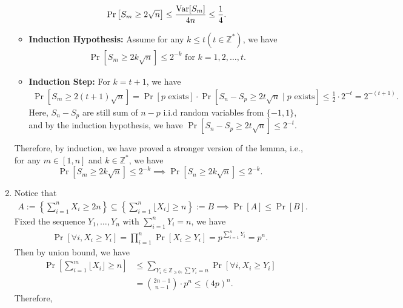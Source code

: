 \begin{answer}
\begin{enumerate}[label=\alph*).]
\begin{itemize}
\begin{align*}
                \Pr\left[S_m \ge 2\sqrt{n}\right] \le \frac{\mathrm{Var}[S_m]}{4n} \le \frac{1}{4}. 
            \end{align*}
            \item \textbf{Induction Hypothesis:} Assume for any $k \le t (t\in \mathbb{Z}^*)$, we have
            \begin{align*}
                \Pr\left[S_m \ge 2k\sqrt{n}\right] \le 2^{-k} \text{ for } k = 1,2,\dots,t.
            \end{align*}
            \item \textbf{Induction Step:} For $k = t+1$, we have
            \begin{align*}
                \Pr\left[S_m \ge 2(t+1)\sqrt{n}\right] = \Pr\left[p \text{ exists}\right] \cdot \Pr\left[S_n - S_p \ge 2t\sqrt{n} \mid p \text{ exists}\right] \le \frac{1}{2} \cdot 2^{-t} = 2^{-(t+1)}.
            \end{align*}
            Here, $S_n - S_p$ are still sum of $n-p$ i.i.d random variables from $\{-1, 1\}$, and by the induction hypothesis, we have $\Pr\left[S_n - S_p \ge 2t\sqrt{n}\right] \le 2^{-t}$.
        \end{itemize}
        Therefore, by induction, we have proved a stronger version of the lemma, i.e.,  for any $m \in [1,n]$ and $k \in \mathbb{Z}^*$, we have
        \[
            \Pr\left[S_m \ge 2k\sqrt{n}\right] \le 2^{-k} \implies \Pr\left[S_n \ge 2k\sqrt{n}\right] \le 2^{-k}.
        \]
        \item Notice that
        \begin{align*}
            A := \left\{\sum_{i=1}^{n}X_i \ge 2n\right\} \subseteq \left\{\sum_{i=1}^{n} \lfloor X_i \rfloor \ge n\right\} := B \implies \Pr[A] \le \Pr[B].
        \end{align*}
        Fixed the sequence $Y_1, \dots, Y_n$ with $\sum_{i=1}^{n} Y_i = n$, we have
        \begin{align*}
            \Pr\left[\forall i, X_i \ge Y_i\right] = \prod_{i=1}^{n} \Pr\left[X_i \ge Y_i\right] = p^{\sum_{i=1}^{n} Y_i} = p^n.
        \end{align*}
        Then by union bound, we have
        \begin{align*}
            \Pr\left[\sum_{i=1}^{m}\lfloor X_i \rfloor \ge n\right] &\le \sum_{Y_i \in \mathbb{Z}_{\ge 0}, \sum Y_i =n} \Pr\left[\forall i, X_i \ge Y_i\right] \\
            &= \binom{2n-1}{n-1}\cdot p^n \le (4p)^n.
        \end{align*}
        Therefore, 

\end{enumerate}
\end{answer}
